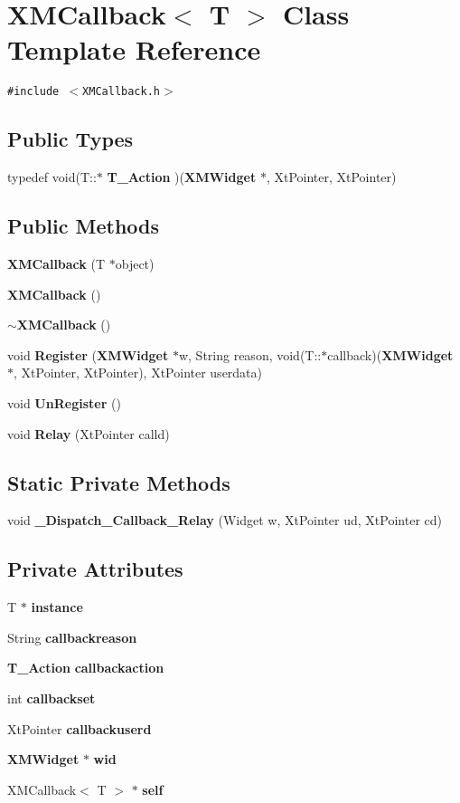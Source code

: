 \section{XMCallback$<$ T $>$  Class Template Reference}
\label{classXMCallback}
{\tt \#include $<$XMCallback.h$>$}

\subsection*{Public Types}
\begin{CompactItemize}
\item 
typedef void(T::$\ast$ {\bf T\_\-Action} )({\bf XMWidget} $\ast$, Xt\-Pointer, Xt\-Pointer)
\end{CompactItemize}
\subsection*{Public Methods}
\begin{CompactItemize}
\item 
{\bf XMCallback} (T $\ast$object)
\item 
{\bf XMCallback} ()
\item 
{\bf $\sim$XMCallback} ()
\item 
void {\bf Register} ({\bf XMWidget} $\ast$w, String reason, void(T::$\ast$callback)({\bf XMWidget} $\ast$, Xt\-Pointer, Xt\-Pointer), Xt\-Pointer userdata)
\item 
void {\bf Un\-Register} ()
\item 
void {\bf Relay} (Xt\-Pointer calld)
\end{CompactItemize}
\subsection*{Static Private Methods}
\begin{CompactItemize}
\item 
void {\bf \_\-Dispatch\_\-Callback\_\-Relay} (Widget w, Xt\-Pointer ud, Xt\-Pointer cd)
\end{CompactItemize}
\subsection*{Private Attributes}
\begin{CompactItemize}
\item 
T $\ast$ {\bf instance}
\item 
String {\bf callbackreason}
\item 
{\bf T\_\-Action} {\bf callbackaction}
\item 
int {\bf callbackset}
\item 
Xt\-Pointer {\bf callbackuserd}
\item 
{\bf XMWidget} $\ast$ {\bf wid}
\item 
XMCallback$<$ T $>$ $\ast$ {\bf self}
\end{CompactItemize}
